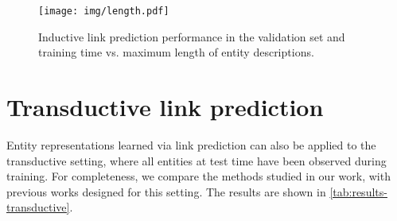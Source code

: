 \documentclass[sigconf]{acmart}
\begin{document}
\begin{figure}[t]
    \centering
    \texttt{[image: img/length.pdf]}
    \caption{Inductive link prediction performance in the validation set and training time vs. maximum length of entity descriptions.}
    \label{fig:length}
\end{figure}

\section{Transductive link prediction}
\label{app:transductive}

Entity representations learned via link prediction can also be applied to the transductive setting, where all entities at test time have been observed during training. For completeness, we compare the methods studied in our work, with previous works designed for this setting. The results are shown in \autoref{tab:results-transductive}.
\end{document}
